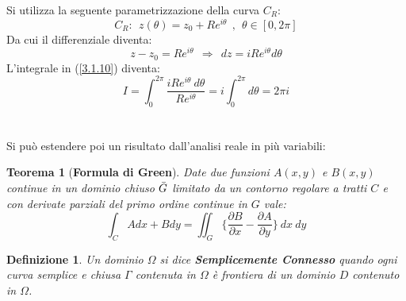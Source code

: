 \documentclass[twoside]{article}
\newtheorem{definition}{Definizione}[section]
\newtheorem{theorem}{Teorema}[section]
\begin{document}
\begin{center}
\end{center}

Si utilizza la seguente parametrizzazione della curva $C_R$:
\begin{equation}
    C_R: \ \ z(\theta)=z_0 + R e^{i\theta} \ \ , \ \ \theta \in [0,2\pi]
\end{equation}
Da cui il differenziale diventa:
\begin{equation}
    z-z_0=Re^{i\theta} \ \ \Rightarrow \ \ dz=iRe^{i\theta}d\theta
\end{equation}
L'integrale in (\ref{3.1.10}) diventa:
\begin{equation}
    I=\int_0 ^{2\pi} \frac{iRe^{i\theta} \ d\theta}{Re^{i\theta}}=i\int_0 ^{2\pi} d\theta =2\pi i
\end{equation}
\\ \\
Si può estendere poi un risultato dall'analisi reale in più variabili:

\begin{theorem}[\textbf{Formula di Green}] \label{Green}
Date due funzioni $A(x,y)$ e $B(x,y)$ continue in un dominio chiuso $\Bar{G}$ limitato da un contorno regolare a tratti $C$ e con derivate parziali del primo ordine continue in $G$ vale:
\begin{equation}
    \int_C Adx+Bdy=\iint_G \biggl\{ \frac{\partial B}{\partial x} - \frac{\partial A}{\partial y} \biggr\} \ dx \ dy
\end{equation}
\end{theorem}

\begin{definition} Un dominio $\Omega$ si dice \textbf{Semplicemente Connesso} quando ogni curva semplice e chiusa $\Gamma$ contenuta in $\Omega$ è frontiera di un dominio $D$ contenuto in $\Omega$.
\end{definition}
\end{document}
